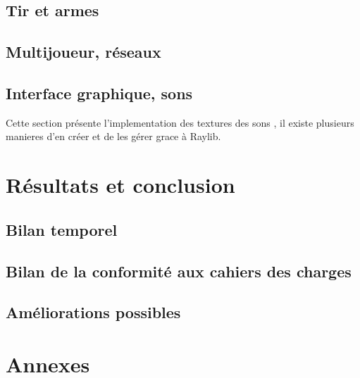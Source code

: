 \documentclass[a4paper,11pt]{article}
\begin{document}
\subsection{Tir et armes}
\subsection{Multijoueur, réseaux}

\subsection{Interface graphique, sons}
\indent Cette section présente l'implementation des textures des sons , il existe plusieurs manieres d'en créer et de les gérer grace à Raylib. 

\section{Résultats et conclusion}
\subsection{Bilan temporel}
\subsection{Bilan de la conformité aux cahiers des charges}
\subsection{Améliorations possibles}
\section{Annexes}
\end{document}
